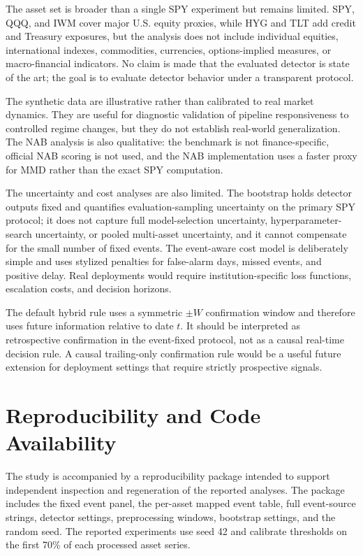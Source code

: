 \documentclass[10pt,twocolumn]{article}
\begin{document}
The asset set is broader than a single SPY experiment but remains limited. SPY, QQQ, and IWM cover major U.S. equity proxies, while HYG and TLT add credit and Treasury exposures, but the analysis does not include individual equities, international indexes, commodities, currencies, options-implied measures, or macro-financial indicators. No claim is made that the evaluated detector is state of the art; the goal is to evaluate detector behavior under a transparent protocol.

The synthetic data are illustrative rather than calibrated to real market dynamics. They are useful for diagnostic validation of pipeline responsiveness to controlled regime changes, but they do not establish real-world generalization. The NAB analysis is also qualitative: the benchmark is not finance-specific, official NAB scoring is not used, and the NAB implementation uses a faster proxy for MMD rather than the exact SPY computation.

The uncertainty and cost analyses are also limited. The bootstrap holds detector outputs fixed and quantifies evaluation-sampling uncertainty on the primary SPY protocol; it does not capture full model-selection uncertainty, hyperparameter-search uncertainty, or pooled multi-asset uncertainty, and it cannot compensate for the small number of fixed events. The event-aware cost model is deliberately simple and uses stylized penalties for false-alarm days, missed events, and positive delay. Real deployments would require institution-specific loss functions, escalation costs, and decision horizons.

The default hybrid rule uses a symmetric $\pm W$ confirmation window and therefore uses future information relative to date $t$. It should be interpreted as retrospective confirmation in the event-fixed protocol, not as a causal real-time decision rule. A causal trailing-only confirmation rule would be a useful future extension for deployment settings that require strictly prospective signals.

\section{Reproducibility and Code Availability}
The study is accompanied by a reproducibility package intended to support independent inspection and regeneration of the reported analyses. The package includes the fixed event panel, the per-asset mapped event table, full event-source strings, detector settings, preprocessing windows, bootstrap settings, and the random seed. The reported experiments use seed 42 and calibrate thresholds on the first 70\% of each processed asset series.
\end{document}
